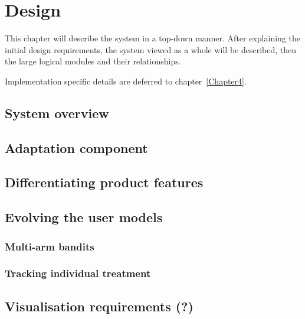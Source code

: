 \chapter{Design}

\label{Chapter3}


% 


This chapter will describe the system in a top-down manner. After explaining the initial design requirements, the system viewed as a whole will be described, then the large logical modules and their relationships.

Implementation specific details are deferred to chapter~\ref{Chapter4}.

\section{System overview} %
\label{sec:system_overview}


\section{Adaptation component} %
\label{sec:adaptation_component}


\section{Differentiating product features} %
\label{sec:differentiating_product_features}


\section{Evolving the user models} %
\label{sec:evolving_the_user_models}

\subsection{Multi-arm bandits}

\subsection{Tracking individual treatment}


\section{Visualisation requirements (?)} %
\label{sec:visualisation_requirements}

